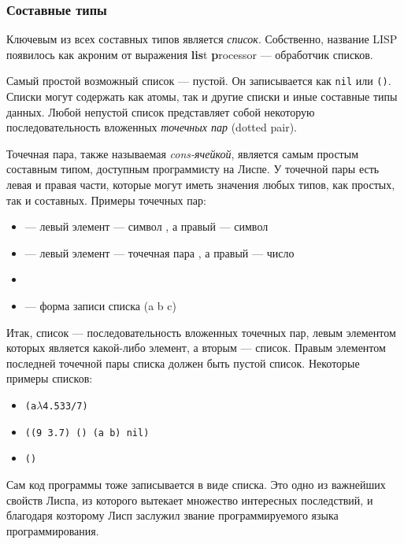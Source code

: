 \documentclass[a4paper, 12pt, titlepage, twoside]{article}
\begin{document}
\subsubsection{Составные типы}
Ключевым из всех составных типов является \textit{список}. Собственно, название LISP появилось как акроним от выражения \textbf{lis}t \textbf{p}rocessor --- обработчик списков.

Самый простой возможный список --- пустой. Он записывается как \verb|nil| или \verb|()|. Списки могут содержать как атомы, так и другие списки и иные составные типы данных. Любой непустой список представляет собой некоторую последовательность вложенных \textit{точечных пар} (dotted pair).

Точечная пара, также называемая \textit{cons-ячейкой}, является самым простым составным типом, доступным программисту на Лиспе. У точечной пары есть левая и правая части, которые могут иметь значения любых типов, как простых, так и составных. Примеры точечных пар:
\begin{itemize}
  \item {} --- левый элемент --- символ , а правый --- символ 
  \item {} ---  левый элемент --- точечная пара , а правый --- число 
  \item {}
  \item {} --- форма записи списка (a b c)
\end{itemize}
Итак, список --- последовательность вложенных точечных пар, левым элементом которых является какой-либо элемент, а вторым --- список. Правым элементом последней точечной пары списка должен быть пустой список. 
Некоторые примеры списков:
\begin{itemize}
  \item \begin{alltt}(a \(\lambda\) 4.5 33/7)\end{alltt}
  \item \verb|((9 3.7) () (a b) nil)|
  \item \verb|()|
\end{itemize}
Сам код программы тоже записывается в виде списка. Это одно из важнейших свойств Лиспа, из которого вытекает множество интересных последствий, и благодаря козторому Лисп заслужил звание программируемого языка программирования.
\end{document}
